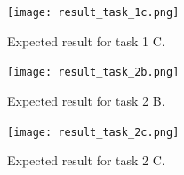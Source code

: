 \documentclass[tp]{lcc}
\begin{document}
\begin{figure}[h]
    \centering
    \texttt{[image: result\_task\_1c.png]}
    \caption{Expected result for task 1 C.}
    \label{fig:task1c}
\end{figure}

\begin{figure}[h]
    \centering
    \texttt{[image: result\_task\_2b.png]}
    \caption{Expected result for task 2 B.}
    \label{fig:task2b}
\end{figure}

\begin{figure}[h]
    \centering
    \texttt{[image: result\_task\_2c.png]}
    \caption{Expected result for task 2 C.}
    \label{fig:task2c}
\end{figure}
\end{document}
